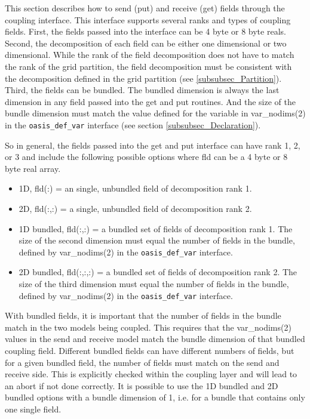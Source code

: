 This section describes how to send (put) and receive (get) fields through
the coupling interface.  This interface supports several ranks and
types of coupling fields.  First, the fields passed into the interface can be 
4 byte or 8 byte reals.  Second, the decomposition of each field can be either one
dimensional or two dimensional.  While the rank of the field decomposition does not
have to match the rank of the grid partition, the field decomposition must be 
consistent with the decomposition defined in the grid partition (see \ref{subsubsec_Partition}).  Third, the fields
can be bundled.  The bundled dimension is always the last dimension in any
field passed into the get and put routines.  And the size of the bundle dimension
must match the value defined for the variable in var\_nodims(2) in the
{\tt oasis\_def\_var} interface (see section \ref{subsubsec_Declaration}).

So in general, the fields passed into the get and put interface can have rank
1, 2, or 3 and include the following possible options where fld can be a 4
byte or 8 byte real array.

\begin{itemize}
\item 1D, fld(:) = an single, unbundled field of decomposition rank 1.
\item 2D, fld(:,:) = a single, unbundled field of decomposition rank 2.
\item 1D bundled, fld(:,:) = a bundled set of fields of decomposition rank 1.
  The size of the second dimension must equal the number of fields in the 
  bundle, defined by var\_nodims(2) in the {\tt oasis\_def\_var} interface.
\item 2D bundled, fld(:,:,:) = a bundled set of fields of decomposition rank 2.
  The size of the third dimension must equal the number of fields in the 
  bundle, defined by var\_nodims(2) in the {\tt oasis\_def\_var} interface.
\end{itemize}

With bundled fields, it is important that the number of fields in the bundle match
in the two models being coupled.  This requires that the var\_nodims(2) values
in the send and receive model match the bundle dimension of that bundled coupling field.
Different bundled fields
can have different numbers of fields, but for a given bundled field, the
number of fields must match on the send and receive side.  This is explicitly
checked within the coupling layer and will lead to an abort if not done correctly.
It is possible to use the 1D bundled and 2D bundled 
options with a bundle dimension of 1, i.e. for a bundle that contains only one single field.


